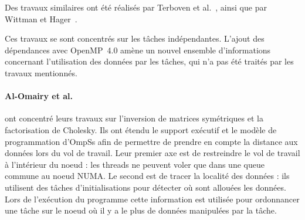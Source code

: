Des travaux similaires ont été réalisés par Terboven et al.~\cite{Terboven2012}, ainsi que par Wittman et Hager~\cite{Wittmann2011}.

Ces travaux se sont concentrés sur les tâches indépendantes.
L'ajout des dépendances avec OpenMP~4.0 amène un nouvel ensemble d'informations concernant l'utilisation des données par les tâches, qui n'a pas été traités par les travaux mentionnés.

\paragraph{Al-Omairy et al.~\cite{Al-Omairy2015}} ont concentré leurs travaux sur l'inversion de matrices symétriques et la factorisation de Cholesky.
Ils ont étendu le support exécutif et le modèle de programmation d'OmpSs afin de permettre de prendre en compte la distance aux données lors du vol de travail.
Leur premier axe est de restreindre le vol de travail à l'intérieur du noeud : les threads ne peuvent voler que dans une queue commune au noeud NUMA.
Le second est de tracer la localité des données : ils utilisent des tâches d'initialisations pour détecter où sont allouées les données. Lors de l'exécution du programme cette information est utilisée pour ordonnancer une tâche sur le noeud où il y a le plus de données manipulées par la tâche.



